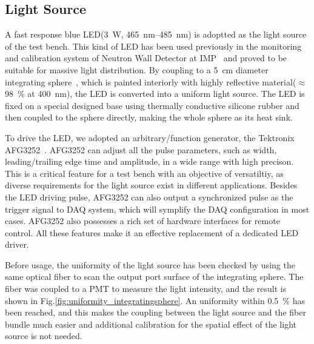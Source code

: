 \documentclass[review, times]{elsarticle}
\begin{document}
\subsection{Light Source}
\label{sec:light_source}

A fast response blue LED(\SI{3}{\watt}, \SIrange{465}{485}{\nano\meter}) is adoptted as the light source of the test bench. 
This kind of LED has been used previously in the monitoring and calibration system of Neutron Wall Detector at IMP~\cite{yuyuhong_led} and proved to be suitable for massive light distribution. 
By coupling to a \SI{5}{\centi\meter} diameter integrating sphere~\cite{integrating_sphere}, which is painted interiorly with highly reflective material($\approx$\SI{98}{\percent} at \SI{400}{\nano\meter}), the LED is converted into a uniform light source.
The LED is fixed on a special designed base using thermally conductive silicone rubber and then coupled to the sphere directly, making the whole sphere as its heat sink.

To drive the LED, we adopted an arbitrary/function generator, the Tektronix AFG3252~\cite{afg3252}. 
AFG3252 can adjust all the pulse parameters, such as width, leading/trailing edge time and amplitude, in a wide range with high precison. 
This is a critical feature for a test bench with an objective of versatiltiy, as diverse requirements for the light source exist in different applications. 
Besides the LED driving pulse, AFG3252 can also output a synchronized pulse as the trigger signal to DAQ system, which will symplify the DAQ configuration in most cases. 
AFG3252 also possesses a rich set of hardware interfaces for remote control.
All these features make it an effective replacement of a dedicated LED driver. 

Before usage, the uniformity of the light source has been checked by using the same optical fiber to scan the output port surface of the integrating sphere. 
The fiber was coupled to a PMT to measure the light intensity, and the result is shown in Fig.\ref{fig:uniformity_integratingsphere}. 
An uniformity within \textpm\SI{0.5}{\percent} has been reached, and this makes the coupling between the light source and the fiber bundle much easier and additional calibration for the spatial effect of the light source is not needed. 
\end{document}
